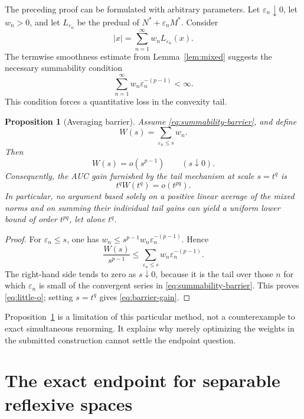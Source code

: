 \documentclass[11pt]{article}
\newtheorem{proposition}[theorem]{Proposition}
\theoremstyle{definition}
\theoremstyle{remark}
\newcommand{\absnorm}[1]{\left\lvert #1\right\rvert}
\newcommand{\eps}{\varepsilon}
\begin{document}
The preceding proof can be formulated with arbitrary parameters.  Let
\(\eps_n\downarrow0\), let \(w_n>0\), and let \(L_{\eps_n}\) be the predual
of \(N^*+\eps_nM^*\).  Consider
\begin{equation}\label{eq:general-average}
 \absnorm{x}=\sum_{n=1}^\infty w_nL_{\eps_n}(x).
\end{equation}
The termwise smoothness estimate from Lemma~\ref{lem:mixed} suggests the
necessary summability condition
\begin{equation}\label{eq:summability-barrier}
 \sum_{n=1}^\infty w_n\eps_n^{-(p-1)}<\infty.
\end{equation}
This condition forces a quantitative loss in the convexity tail.

\begin{proposition}[Averaging barrier]\label{prop:barrier}
Assume \eqref{eq:summability-barrier}, and define
\[
 W(s)=\sum_{\eps_n\le s}w_n.
\]
Then
\begin{equation}\label{eq:little-o}
 W(s)=o(s^{p-1})\qquad(s\downarrow0).
\end{equation}
Consequently, the AUC gain furnished by the tail mechanism at scale
\(s=t^q\) is
\begin{equation}\label{eq:barrier-gain}
 t^qW(t^q)=o(t^{pq}).
\end{equation}
In particular, no argument based solely on a positive linear average of the
mixed norms and on summing their individual tail gains can yield a uniform
lower bound of order \(t^{pq}\), let alone \(t^q\).
\end{proposition}

\begin{proof}
For \(\eps_n\le s\), one has
\(w_n\le s^{p-1}w_n\eps_n^{-(p-1)}\).  Hence
\[
 \frac{W(s)}{s^{p-1}}
 \le \sum_{\eps_n\le s}w_n\eps_n^{-(p-1)}.
\]
The right-hand side tends to zero as \(s\downarrow0\), because it is the
tail over those \(n\) for which \(\eps_n\) is small of the convergent series
in \eqref{eq:summability-barrier}.  This proves \eqref{eq:little-o}; setting
\(s=t^q\) gives \eqref{eq:barrier-gain}.
\end{proof}

Proposition~\ref{prop:barrier} is a limitation of this particular method, not
a counterexample to exact simultaneous renorming.  It explains why merely
optimizing the weights in the submitted construction cannot settle the
endpoint question.

\section{The exact endpoint for separable reflexive spaces}
\end{document}
